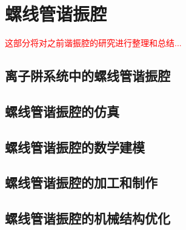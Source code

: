 
\chapter[螺线管谐振腔]{螺线管谐振腔}
\textcolor{red}{
这部分将对之前谐振腔的研究进行整理和总结...
}
\section[离子阱系统中的螺线管谐振腔]{离子阱系统中的螺线管谐振腔}

\section[螺线管谐振腔的仿真]{螺线管谐振腔的仿真}

\section[螺线管谐振腔的数学建模]{螺线管谐振腔的数学建模}

\section[螺线管谐振腔的加工和制作]{螺线管谐振腔的加工和制作}

\section[螺线管谐振腔的机械结构优化]{螺线管谐振腔的机械结构优化}

